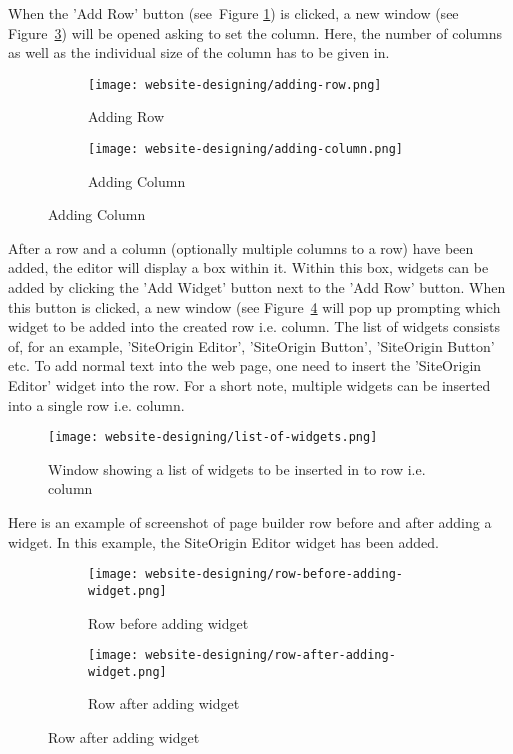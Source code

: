 When the 'Add Row' button (see~Figure \ref{adding-row}) is clicked, a new window (see Figure~\ref{adding-column}) will be opened asking to set the column. Here, the number of columns as well as the individual size of the column has to be given in.

\begin{figure}[h]
\centering
	\begin{subfigure}{.49\linewidth}
	\centering
	\caption{Adding Row}
	\label{adding-row}
	\texttt{[image: website-designing/adding-row.png]}
	\end{subfigure}
	\begin{subfigure}{0.49\linewidth}
	\centering
	\caption{Adding Column}
	\label{adding-column}
	\texttt{[image: website-designing/adding-column.png]}
	\end{subfigure}
\end{figure}

After a row and a column (optionally multiple columns to a row) have been added, the editor will display a box within it. Within this box, widgets can be added by clicking the 'Add Widget' button next to the 'Add Row' button. When this button is clicked, a new window (see Figure~\ref{list-of-widgets} will pop up prompting which widget to be added into the created row i.e. column. The list of widgets consists of, for an example, 'SiteOrigin Editor', 'SiteOrigin Button', 'SiteOrigin Button' etc. To add normal text into the web page, one need to insert the 'SiteOrigin Editor' widget into the row. For a short note, multiple widgets can be inserted into a single row i.e. column.

\begin{figure}[h]
\centering
\caption{Window showing a list of widgets to be inserted in to row i.e. column}
\label{list-of-widgets}
\texttt{[image: website-designing/list-of-widgets.png]}
\end{figure}

Here is an example of screenshot of page builder row before and after adding a widget. In this example, the SiteOrigin Editor widget has been added.

\begin{figure}[h]
\centering
	\begin{subfigure}{.49\linewidth}
	\centering
	\caption{Row before adding widget}
	\label{row-before-adding-widget}
	\texttt{[image: website-designing/row-before-adding-widget.png]}
	\end{subfigure}
	\begin{subfigure}{0.49\linewidth}
	\centering
	\caption{Row after adding widget}
	\label{Row after adding widget}
	\texttt{[image: website-designing/row-after-adding-widget.png]}
	\end{subfigure}
\end{figure}

